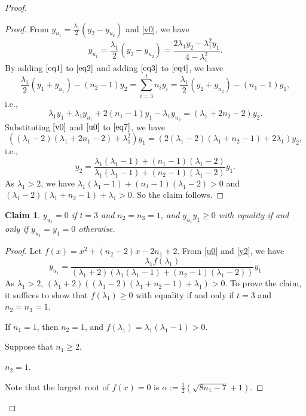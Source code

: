 \documentclass[10pt,a4paper]{amsart}
\numberwithin{equation}{section}
\newtheorem {Claim} {Claim}[section]
\begin{document}
\begin{proof}
\begin{proof}
From $y_{u_1}=\frac{\lambda_1}{2}(y_2-y_{u_2})$ and \eqref{v0}, we have
\begin{equation}\label{u0}
y_{u_1}=\frac{\lambda_1}{2}\left(y_2-y_{u_2}\right)=\frac{2\lambda_1y_2-\lambda_1^2y_1}{4-\lambda_1^2}.
\end{equation}
By adding $\eqref{eq1}$ to $\eqref{eq2}$ and adding $\eqref{eq3}$ to $\eqref{eq4}$, we have
\[
\frac{\lambda_1}{2}(y_1+y_{u_1})-(n_2-1)y_2=\sum_{i=3}^tn_iy_i=\frac{\lambda_1}{2}(y_2+y_{u_2})-(n_1-1)y_1, \]
i.e.,
\begin{equation}\label{eq7}
\lambda_1y_1+\lambda_1y_{u_1}+2(n_1-1)y_1-\lambda_1y_{u_2}=(\lambda_1+2n_2-2)y_2.
\end{equation}
Substituting $\eqref{v0}$ and $\eqref{u0}$ to $\eqref{eq7}$, we have
\[
\left((\lambda_1-2)(\lambda_1+2n_1-2)+\lambda_1^2\right)y_1=\left(2(\lambda_1-2)(\lambda_1+n_2-1)+2\lambda_1\right)y_2,
\]
i.e., 
\begin{equation}\label{y2}
y_2 
 =\frac{\lambda_1(\lambda_1-1)+(n_1-1)(\lambda_1-2)}{\lambda_1(\lambda_1-1)+(n_2-1)(\lambda_1-2)}y_1.
\end{equation}
As $\lambda_1>2$, we have  $\lambda_1(\lambda_1-1)+(n_1-1)(\lambda_1-2)>0$ and $(\lambda_1-2)(\lambda_1+n_2-1)+\lambda_1>0$. 
So the claim follows.
\end{proof}

\begin{Claim} \label{Y2}
 $y_{u_1}=0$ if $t=3$ and $n_2=n_3=1$, and 
$y_{u_1}y_1\ge 0$
with equality if and only if $y_{u_1}=y_1=0$ otherwise.
\end{Claim}

\begin{proof}
Let $f(x)=x^2+(n_2-2)x-2n_1+2$. 
From \eqref{u0} and \eqref{y2}, we have
\[
y_{u_1}=\frac{\lambda_1f(\lambda_1)}{(\lambda_1+2)(\lambda_1(\lambda_1-1)+(n_2-1)(\lambda_1-2))}y_1
\]
As $\lambda_1>2$,  $(\lambda_1+2)((\lambda_1-2)(\lambda_1+n_2-1)+\lambda_1)>0$. To prove the claim, it suffices to show that 
 $f(\lambda_1)\ge 0$ with equality if and only if $t=3$ and $n_2=n_3=1$. 



If $n_1=1$, then $n_2=1$, and $f(\lambda_1)=\lambda_1(\lambda_1-1)>0$. 

Suppose that $n_1\ge 2$. 

 $n_2=1$. 

Note that the largest root of $f(x)=0$ is $\alpha:=\frac{1}{2}\left(\sqrt{8n_1-7}+1\right)$. 
 

\end{proof}
\end{proof}
\end{document}
